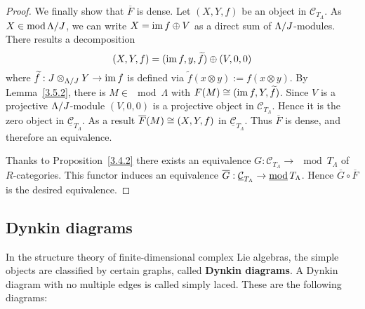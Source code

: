 \begin{proof}
We finally show that $\overline F$ is dense. Let $(X, Y, f)$ be an object in
$\mathcal{C}_{T_\Lambda}$. As $X \in \operatorname{mod}{\Lambda/J}$, we can write $X = \operatorname{im} f \oplus V$ as a direct sum of $\Lambda/J$-modules. There results a decomposition
\[
(X, Y, f) = (\operatorname{im} f, y, \widetilde f) \oplus (V, 0, 0)
\]
where $\widetilde f: J \otimes_{\Lambda/J} Y \to \operatorname{im} f$ is defined via $\widetilde f(x\otimes y):=f(x\otimes y)$. By
Lemma~\ref{3.5.2}, there is $M \in \mod \Lambda$ with $F(M) \cong (\operatorname{im} f, Y, \widetilde f)$.
Since $V$ is a projective $\Lambda/J$-module $(V, 0, 0)$ is a
projective object in $\mathcal{C}_{T_\Lambda}$. Hence it is the zero object in
$\underline{\mathcal{C}}_{T_\Lambda}$. As a result $\overline F(M) \cong (X, Y, f)$ in
$\underline{\mathcal{C}}_{T_\Lambda}$. Thus $\overline F$ is dense, and therefore an
equivalence.

Thanks to Proposition~\ref{3.4.2} there exists an equivalence $G: \mathcal{C}_{T_\Lambda} \to \mod{T_\Lambda}$ of $R$-categories. This functor induces an equivalence $\overline G: \underline{\mathcal{C}}_{T_\Lambda} \to \operatorname{\underline{\operatorname{mod}}}{T_\Lambda}$. Hence $\overline G \circ \overline F$ is the desired equivalence.
\end{proof}


\subsection*{Dynkin diagrams}


In the structure theory of finite-dimensional complex Lie algebras, the simple objects are classified by certain graphs, called \textbf{Dynkin diagrams}. A Dynkin diagram with no multiple edges is called simply laced. These are the following diagrams:


\bigskip


